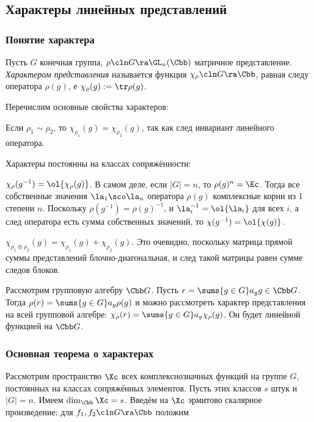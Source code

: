 \documentclass[a4paper]{article}
\newcommand{\sumg}{\sums{g\in G}}
\begin{document}
 \subsection{Характеры линейных представлений}

 \subsubsection{Понятие характера}

\begin{df}
Пусть $G$ конечная группа, $\rho\cln G \ra \GL_n(\Cbb)$ матричное представление.  \emph{Характером
представления} называется функция $\chi_\rho\cln G \ra \Cbb$, равная следу оператора $\rho(g)$, е
$\chi_\rho(g):=\tr \rho(g)$.
\end{df}

Перечислим основные свойства характеров:

 Если $\rho_1 \sim \rho_2$, то $\chi_{\rho_1}(g)=\chi_{\rho_2}(g)$, так как след инвариант
линейного оператора.

 Характеры постоянны на классах сопряжённости:

 $\chi_\rho(g^{-1})=\ol{\chi_\rho(g)}$. В самом деле, если $|G|=n$, то $\rho(g)^n=\Ec$. Тогда все собственные значения $\la_1 \sco \la_n$ оператора
$\rho(g)$ комплексные корни из 1 степени $n$. Поскольку $\rho(g^{-1})=\rho(g)^{-1}$, и $\la_i^{-1}=\ol{\la_i}$ для всех $i$, а след оператора есть сумма
собственных значений, то $\chi(g^{-1})=\ol{\chi(g)}$.

 $\chi_{\rho_1 \oplus \rho_2}(g) = \chi_{\rho_1}(g) + \chi_{\rho_2}(g)$. Это очевидно,  поскольку
матрица прямой суммы представлений блочно-диагональная, и след такой матрицы равен сумме следов блоков.

Рассмотрим групповую алгебру $\Cbb G$. Пусть $r=\sumg a_g g \in \Cbb G$. Тогда $\rho(r)=\sumg a_g \rho(g)$ и
можно рассмотреть характер представления на всей групповой  алгебре: $\chi_\rho(r)=\sumg a_g \chi_\rho(g)$.
Он будет линейной функцией на $\Cbb G$.

\subsubsection{Основная теорема о характерах}

Рассмотрим пространство $\Xc$ всех комплекснозначных функций на группе $G$, постоянных на классах
сопряжённых элементов. Пусть этих классов $s$ штук и $|G|=n$. Имеем $\dim_\Cbb \Xc = s$. Введём на $\Xc$
эрмитово скалярное произведение: для $f_1, f_2\cln G \ra \Cbb$ положим
\eqn{(f_1, f_2):=\frac{1}{n}\sumg \ol{f_1(g)}f_2(g).}
\end{document}
